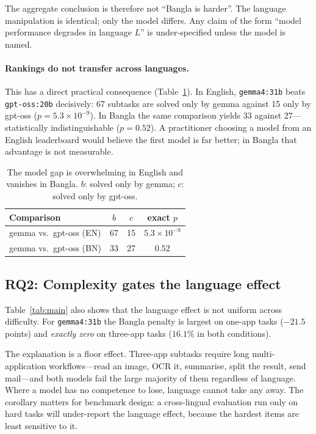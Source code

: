 \documentclass[11pt]{article}
\begin{document}
The aggregate conclusion is therefore not ``Bangla is harder''. The language manipulation is
identical; only the model differs. Any claim of the form ``model performance degrades in
language $L$'' is under-specified unless the model is named.

\paragraph{Rankings do not transfer across languages.}
This has a direct practical consequence (Table~\ref{tab:rank}). In English, \texttt{gemma4:31b}
beats \texttt{gpt-oss:20b} decisively: 67 subtasks are solved only by gemma against 15 only by
gpt-oss ($p=5.3\times10^{-9}$). In Bangla the same comparison yields 33 against 27---
statistically indistinguishable ($p=0.52$). A practitioner choosing a model from an English
leaderboard would believe the first model is far better; in Bangla that advantage is not
measurable.

\begin{table}[t]
\centering\small
\begin{tabular}{lccc}
\toprule
Comparison & $b$ & $c$ & exact $p$ \\
\midrule
gemma vs.\ gpt-oss (EN) & 67 & 15 & $5.3{\times}10^{-9}$ \\
gemma vs.\ gpt-oss (BN) & 33 & 27 & $0.52$ \\
\bottomrule
\end{tabular}
\caption{The model gap is overwhelming in English and vanishes in Bangla. $b$: solved only by
gemma; $c$: solved only by gpt-oss.}
\label{tab:rank}
\end{table}

\subsection{RQ2: Complexity gates the language effect}

Table~\ref{tab:main} also shows that the language effect is not uniform across difficulty. For
\texttt{gemma4:31b} the Bangla penalty is largest on one-app tasks ($-21.5$ points) and
\emph{exactly zero} on three-app tasks ($16.1\%$ in both conditions).

The explanation is a floor effect. Three-app subtasks require long multi-application
workflows---read an image, OCR it, summarise, split the result, send mail---and both models fail
the large majority of them regardless of language. Where a model has no competence to lose,
language cannot take any away. The corollary matters for benchmark design: a cross-lingual
evaluation run only on hard tasks will under-report the language effect, because the hardest
items are least sensitive to it.
\end{document}
